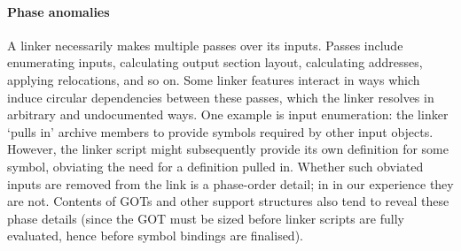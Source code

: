 \documentclass[preprint,10pt]{sigplanconf-pldi16}
\begin{document}
\paragraph{Phase anomalies} 
A linker necessarily makes multiple passes over its inputs.
Passes include enumerating inputs, calculating output section layout, 
calculating addresses, applying relocations, and so on.
Some linker features interact in ways which induce circular dependencies between
these passes, which the linker resolves in arbitrary and undocumented ways.
One example is input enumeration: the linker `pulls in' archive members 
to provide symbols required by other input objects.
However, the linker script might subsequently provide its own definition
for some symbol, obviating the need for a definition pulled in.
Whether such obviated inputs are removed from the link is a phase-order detail;
in in our experience they are not.
Contents of GOTs and other support structures also tend to reveal these phase details 
(since the GOT must be sized before linker scripts are fully evaluated, hence before
symbol bindings are finalised).

% 


\end{document}
